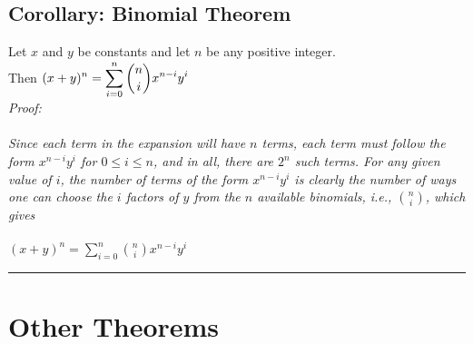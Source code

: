 \newpage
\subsection{Corollary: Binomial Theorem}
\label{BinomialTheor2.2}
Let $x$ and $y$ be constants and let $n$ be any positive integer.\\
Then $\displaystyle (x+y)^n = \sum\limits_{i=0}^{n} {n\choose i} x^{n-i} y^i\\$
\\
\it Proof: \rm \\
\\
Since each term in the expansion will have $n$ terms, each term must follow the form $x^{n-i} y^i$ for $0 \leq i \leq n$, and in all, there are $2^n$ such terms.  For any given value of $i$, the number of terms of the form $x^{n-i}y^i$ is clearly the number of ways one can choose the $i$ factors of $y$ from the $n$ available binomials, i.e., ${n\choose i}$, which gives\\
\\
$\displaystyle (x+y)^n = \sum\limits_{i=0}^{n}{n\choose i} x^{n-i} y^i$ \rule{.05in}{.05in}

\section{Other Theorems}
\label{BinomialTheor3}
